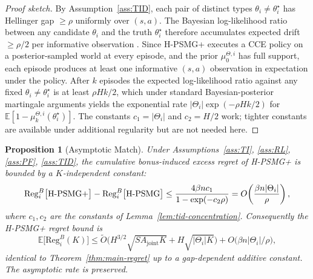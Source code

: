 \documentclass{article}
\newtheorem{proposition}[theorem]{Proposition}
\def\textsuperscript#1{#1}%
\begin{document}
\begin{proof}[Proof sketch]
By Assumption~\ref{ass:TID}, each pair of distinct types $\theta_i \neq \theta_i^\star$ has Hellinger gap $\geq \rho$ uniformly over $(s, a)$. The Bayesian log-likelihood ratio between any candidate $\theta_i$ and the truth $\theta_i^\star$ therefore accumulates expected drift $\geq \rho/2$ per informative observation \citep[Lemma 5.3]{ghosal2007convergence}. Since H-PSMG\textsuperscript{+} executes a CCE policy on a posterior-sampled world at every episode, and the prior $\mu_0^{\Theta, i}$ has full support, each episode produces at least one informative $(s, a)$ observation in expectation under the policy. After $k$ episodes the expected log-likelihood ratio against any fixed $\theta_i \neq \theta_i^\star$ is at least $\rho H k / 2$, which under standard Bayesian-posterior martingale arguments yields the exponential rate $|\Theta_i| \exp(-\rho H k / 2)$ for $\mathbb{E}[1 - \mu_k^{\Theta, i}(\theta_i^\star)]$. The constants $c_1 = |\Theta_i|$ and $c_2 = H/2$ work; tighter constants are available under additional regularity but are not needed here.
\end{proof}

\begin{proposition}[Asymptotic Match]
\label{prop:hpsmg-plus-asymptotic}
Under Assumptions~\ref{ass:TI}, \ref{ass:RL}, \ref{ass:PF}, \ref{ass:TID}, the cumulative bonus-induced excess regret of H-PSMG\textsuperscript{+} is bounded by a $K$-independent constant:
\begin{equation}
\mathrm{Reg}_i^B\big[\textnormal{H-PSMG\textsuperscript{+}}\big] - \mathrm{Reg}_i^B\big[\textnormal{H-PSMG}\big] \leq \frac{4 \beta n c_1}{1 - \exp(-c_2 \rho)} = O\!\left(\frac{\beta n |\Theta_i|}{\rho}\right),
\end{equation}
where $c_1, c_2$ are the constants of Lemma~\ref{lem:tid-concentration}. Consequently the H-PSMG\textsuperscript{+} regret bound is
\begin{equation}
\mathbb{E}\big[\mathrm{Reg}_i^B(K)\big] \leq \tilde O\big(H^{3/2}\sqrt{SA_{\mathrm{joint}}K} + H\sqrt{|\Theta_i| K}\big) + O\big(\beta n |\Theta_i| / \rho\big),
\end{equation}
identical to Theorem~\ref{thm:main-regret} up to a gap-dependent additive constant. The asymptotic rate is preserved.
\end{proposition}
\end{document}
